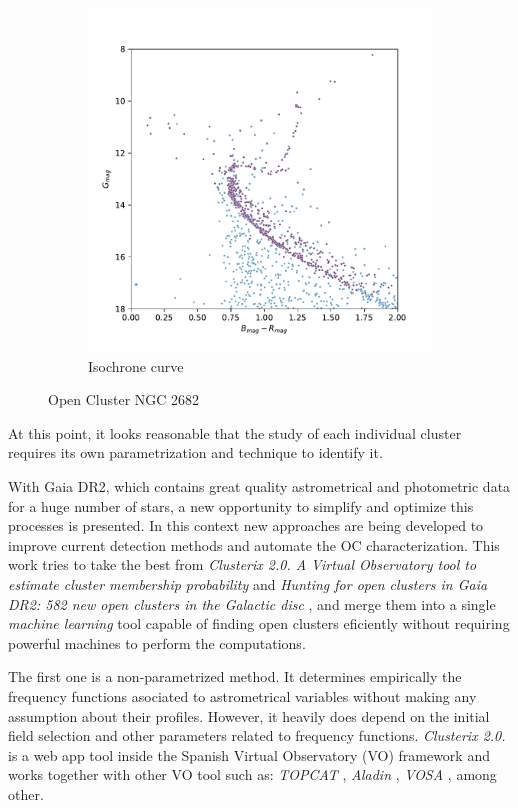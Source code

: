 \documentclass[11pt, a4paper, english]{book}
\begin{document}
\begin{figure}[htbp]
\begin{subfigure}[t]{0.45\textwidth}
    \includegraphics[width=\textwidth]{../figures/isochrone_ngc_2682.pdf}
    \caption{Isochrone curve}
    \label{fig:parallax_ngc_2682}
  \end{subfigure}
  \caption{Open Cluster NGC 2682}
\end{figure}

At this point, it looks reasonable that the study of each individual cluster requires its own parametrization and technique
to identify it.

With Gaia DR2, which contains great quality astrometrical and photometric data for a huge number of stars,
a new opportunity to simplify and optimize this processes is presented.
In this context new approaches are being developed to improve current detection methods and automate the OC characterization.
This work tries to take the best from \emph{Clusterix 2.0. A Virtual Observatory tool to estimate cluster membership probability}
\cite{balaguer2020clusterix} and \emph{Hunting for open clusters in Gaia DR2: 582 new open clusters
in the Galactic disc} \cite{castro2020hunting}, and merge them into a single \emph{machine learning}
tool capable of finding open clusters eficiently without requiring powerful machines to perform the computations.

The first one is a non-parametrized method. It determines empirically the frequency functions asociated to astrometrical variables
without making any assumption about their profiles. However, it heavily does depend on the initial field selection and other
parameters related to frequency functions. \emph{Clusterix 2.0.} is a web app tool inside the Spanish Virtual Observatory
(VO) framework and works together with other VO tool such as:
\emph{TOPCAT} \cite{taylor2005topcat},
\emph{Aladin} \cite{bonnarel2000aladin},
\emph{VOSA} \cite{bayo2008vosa}, among other.
\end{document}
